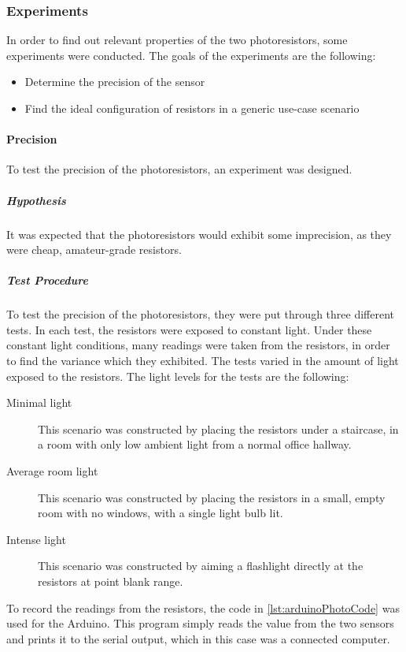 \subsubsection{Experiments}
In order to find out relevant properties of the two photoresistors, some experiments were conducted. The goals of the experiments are the following:

\begin{itemize}
  \item Determine the precision of the sensor
  \item Find the ideal configuration of resistors in a generic use-case scenario
\end{itemize}

\paragraph{Precision}\label{subsub:precision}
To test the precision of the photoresistors, an experiment was designed.
\subparagraph{Hypothesis}
It was expected that the photoresistors would exhibit some imprecision, as they were cheap, amateur-grade resistors.
\subparagraph{Test Procedure}
To test the precision of the photoresistors, they were put through three different tests. In each test, the resistors were exposed to constant light. Under these constant light conditions, many readings were taken from the resistors, in order to find the variance which they exhibited.
The tests varied in the amount of light exposed to the resistors. The light levels for the tests are the following:

\begin{description}
  \item[Minimal light]
  This scenario was constructed by placing the resistors under a staircase, in a room with only low ambient light from a normal office hallway.
  \item[Average room light]
  This scenario was constructed by placing the resistors in a small, empty room with no windows, with a single light bulb lit.
  \item[Intense light]
  This scenario was constructed by aiming a flashlight directly at the resistors at point blank range.
\end{description}

To record the readings from the resistors, the code in \cref{lst:arduinoPhotoCode} was used for the Arduino. This program simply reads the value from the two sensors and prints it to the serial output, which in this case was a connected computer.

